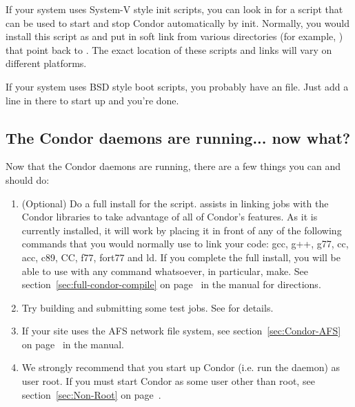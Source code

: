 If your system uses System-V style init scripts, you can look in
 for a script that can be used
to start and stop Condor automatically by init.  Normally, you would
install this script as  and put in soft link from
various directories (for example, ) that point back to
.  The exact location of these scripts and links
will vary on different platforms.

If your system uses BSD style boot scripts, you probably have an
 file.  Just add a line in there to start up
 and you're done.


\subsection{The Condor daemons are running... now what?}

Now that the Condor daemons are running, there are a few things you
can and should do:

\begin{enumerate}
\item (Optional) Do a full install for the  script.
     assists in linking jobs with the Condor libraries
    to take advantage of all of Condor's features.  As it is currently
    installed, it will work by placing it in front of any of the
    following commands that you would normally use to link your code:
    gcc, g++, g77, cc, acc, c89, CC, f77, fort77 and ld.  If you
    complete the full install, you will be able to use
     with any command whatsoever, in particular, make.
    See section~\ref{sec:full-condor-compile} on
    page~\pageref{sec:full-condor-compile} in the manual for
    directions.

\item Try building and submitting some test jobs.  See
     for details.

\item If your site uses the AFS network file system, see
section~\ref{sec:Condor-AFS} on page~\pageref{sec:Condor-AFS} in the
manual.

\item We strongly recommend that you start up Condor (i.e. run the
 daemon) as user root.  If you must start Condor as
some user other than root, see section~\ref{sec:Non-Root} on
page~\pageref{sec:Non-Root}.

\end{enumerate}
